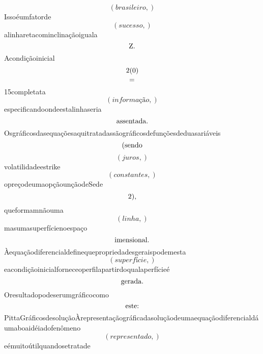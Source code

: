 \documentclass{article}
\begin{document}
\begin{equation}
\left( brasileiro,\right)
\end{equation}Issoéumfatorde\begin{equation}
\left( sucesso,\right)
\end{equation}alinharetacominclinaçãoiguala\begin{equation}
$Z.$
\end{equation}Acondiçãoinicial\begin{equation}
$2(0)$
\end{equation}\begin{equation}
$=$
\end{equation}15completata\begin{equation}
\left( informação,\right)
\end{equation}especificandoondeestalinhaseria\begin{equation}
$assentada.$
\end{equation}Osgráficosdasequaçõesaquitratadassãográficosdefunçõesdeduasariáveis\begin{equation}
$(sendo$
\end{equation}\begin{equation}
\left( juros,\right)
\end{equation}volatilidadeestrike\begin{equation}
\left( constantes,\right)
\end{equation}opreçodeumaopçãounçãodeSede\begin{equation}
$2),$
\end{equation}queformamnãouma\begin{equation}
\left( linha,\right)
\end{equation}masumasuperfícienoespaço\begin{equation}
$imensional.$
\end{equation}Àequaçãodiferencialdefinequepropriedadesgeraispodemesta\begin{equation}
\left( superfície,\right)
\end{equation}eacondiçãoinicialforneceoperfilapartirdoqualaperfícieé\begin{equation}
$gerada.$
\end{equation}Oresultadopodeserumgráficocomo\begin{equation}
$este:$
\end{equation}PittaGráficosdesoluçãoÀrepresentaçãográficadasoluçãodeumaequaçãodiferencialdáumaboaidéiadofenômeno\begin{equation}
\left( representado,\right)
\end{equation}eémuitoútilquandosetratade\begin{equation}

\end{equation}
\end{document}
